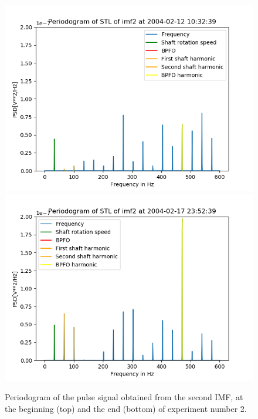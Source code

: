 \documentclass[../Main/thesis.tex]{subfiles}
\begin{document}
 \begin{figure}[H]
	\centering
	\includegraphics[width=0.8\linewidth]{../fig/periodogram_bpfo/start_imf2_bpfo}
	\includegraphics[width=0.8\linewidth]{../fig/periodogram_bpfo/end_imf2_bpfo}
	\caption{Periodogram of the pulse signal obtained from the second IMF, at the beginning (top) and the end (bottom) of experiment number 2.}
	\label{fig:startimf2bpfo}
\end{figure}
\end{document}
